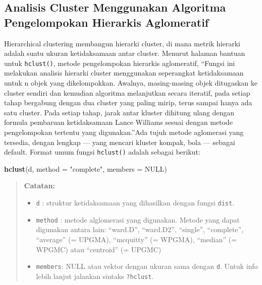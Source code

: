 \documentclass[]{book}
\newenvironment{Shaded}{\begin{snugshade}}{\end{snugshade}}
\newcommand{\DataTypeTok}[1]{\textcolor[rgb]{0.13,0.29,0.53}{#1}}
\newcommand{\KeywordTok}[1]{\textcolor[rgb]{0.13,0.29,0.53}{\textbf{#1}}}
\newcommand{\NormalTok}[1]{#1}
\newcommand{\OtherTok}[1]{\textcolor[rgb]{0.56,0.35,0.01}{#1}}
\newcommand{\StringTok}[1]{\textcolor[rgb]{0.31,0.60,0.02}{#1}}
\providecommand{\tightlist}{%
  \setlength{\itemsep}{0pt}\setlength{\parskip}{0pt}}
\theoremstyle{definition}
\theoremstyle{definition}
\theoremstyle{definition}
\theoremstyle{remark}
\begin{document}
\hypertarget{analisis-cluster-menggunakan-algoritma-pengelompokan-hierarkis-aglomeratif}{%
\subsection{Analisis Cluster Menggunakan Algoritma Pengelompokan Hierarkis Aglomeratif}\label{analisis-cluster-menggunakan-algoritma-pengelompokan-hierarkis-aglomeratif}}

Hierarchical clustering membangun hierarki cluster, di mana metrik hierarki adalah suatu ukuran ketidaksamaan antar cluster. Menurut halaman bantuan untuk \texttt{hclust()}, metode pengelompokan hierarkis aglomeratif, ``Fungsi ini melakukan analisis hierarki cluster menggunakan seperangkat ketidaksamaan untuk n objek yang dikelompokkan. Awalnya, masing-masing objek ditugaskan ke cluster sendiri dan kemudian algoritma melanjutkan secara iteratif, pada setiap tahap bergabung dengan dua cluster yang paling mirip, terus sampai hanya ada satu cluster. Pada setiap tahap, jarak antar kluster dihitung ulang dengan formula pembaruan ketidaksamaan Lance Williams sesuai dengan metode pengelompokan tertentu yang digunakan.''Ada tujuh metode aglomerasi yang tersedia, dengan lengkap --- yang mencari kluster kompak, bola --- sebagai default. Format umum fungsi \texttt{hclust()} adalah sebagai berikut:

\begin{Shaded}
\begin{Highlighting}[]
\KeywordTok{hclust}\NormalTok{(d, }\DataTypeTok{method =} \StringTok{"complete"}\NormalTok{, }\DataTypeTok{members =} \OtherTok{NULL}\NormalTok{)}
\end{Highlighting}
\end{Shaded}

\begin{quote}
\textbf{Catatan:}

\begin{itemize}
\tightlist
\item
  \texttt{d} : struktur ketidaksamaan yang dihasilkan dengan fungsi \texttt{dist}.
\item
  \texttt{method} : metode alglomerasi yang digunakan. Metode yang dapat digunakan antara lain: ``ward.D'', ``ward.D2'', ``single'', ``complete'', ``average'' (= UPGMA), ``mcquitty'' (= WPGMA), ``median'' (= WPGMC) atau ``centroid'' (= UPGMC)
\item
  \texttt{members}: NULL atau vektor dengan ukuran sama dengan \texttt{d}. Untuk info lebih lanjut jalankan sintaks \texttt{?hclust}.
\end{itemize}
\end{quote}
\end{document}
